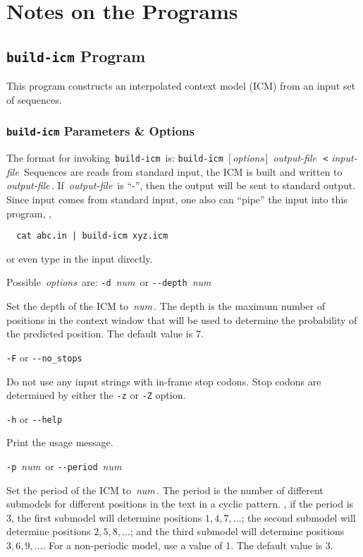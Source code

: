 \documentclass[fleqn,titlepage,11pt]{article}
\def\Desc#1{\,\mbox{\emph{#1}}\,}
\def\Pg#1{\texttt{#1}}
\begin{document}
\section{Notes on the Programs}

\subsection{\Pg{build-icm} Program}

This program constructs an interpolated context model (ICM)
from an input set of sequences.

\subsubsection{\Pg{build-icm} Parameters \& Options}
The format for invoking \,\Pg{build-icm}\, is:
\bq
  \Pg{build-icm}\, [\Desc{options}] \Desc{output-file} \,\Pg{<}\,\Desc{input-file}
\eq
Sequences are reads from standard input, the ICM is
built and written to \Desc{output-file}.  If \Desc{output-file}
is ``-'', then the output will be sent to standard output.
Since input comes from standard input, one also can ``pipe'' the input
into this program, \eg,
\BSV\begin{verbatim}
  cat abc.in | build-icm xyz.icm
\end{verbatim}\ESV
or even type in the input directly.

Possible \Desc{options} are:
\bl{}\RaggedRight
\exdent
  \verb`-d` \Desc{num} \enskip or \enskip \verb`--depth` \Desc{num}

  Set the depth of the ICM to \Desc{num}.  The depth is the
  maximum number of positions in the context window that
  will be used to determine the probability of the predicted
  position.  The default value is 7.

\exdent
  \verb`-F` \enskip or \enskip \verb`--no_stops`

  Do not use any input strings with in-frame stop codons.
  Stop codons are determined by either the \Pg{-z} or \Pg{-Z}
  option.

\exdent
  \verb`-h` \enskip or \enskip \verb`--help`

  Print the usage message.

\exdent
  \verb`-p` \Desc{num} \enskip or \enskip \verb`--period` \Desc{num}

  Set the period of the ICM to \Desc{num}.  The period is the
  number of different submodels for different positions in the
  text in a cyclic pattern.  \Eg, if the period is 3, the first
  submodel will determine positions $1, 4, 7, \dots$; the second
  submodel will determine positions $2, 5, 8, \dots$; and the third
  submodel will determine positions $3, 6, 9, \dots$.  For a
  non-periodic model, use a value of 1.  The default value
  is 3.
\end{document}

